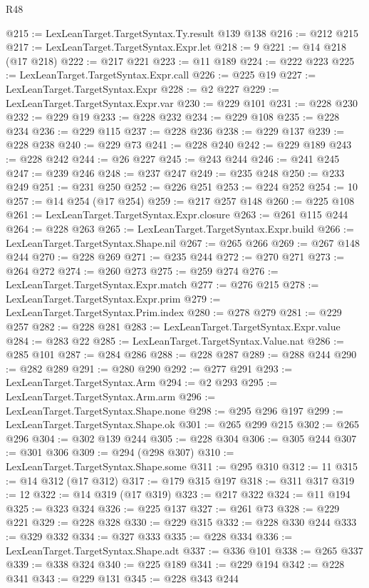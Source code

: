 \begin{lexlean}{R48}
\begin{coremodule}
@215 := LexLeanTarget.TargetSyntax.Ty.result @139 @138
@216 := @212 @215
@217 := LexLeanTarget.TargetSyntax.Expr.let
@218 := 9
@221 := @14 @218 (@17 @218)
@222 := @217 @221
@223 := @11 @189
@224 := @222 @223
@225 := LexLeanTarget.TargetSyntax.Expr.call
@226 := @225 @19
@227 := LexLeanTarget.TargetSyntax.Expr
@228 := @2 @227
@229 := LexLeanTarget.TargetSyntax.Expr.var
@230 := @229 @101
@231 := @228 @230
@232 := @229 @19
@233 := @228 @232
@234 := @229 @108
@235 := @228 @234
@236 := @229 @115
@237 := @228 @236
@238 := @229 @137
@239 := @228 @238
@240 := @229 @73
@241 := @228 @240
@242 := @229 @189
@243 := @228 @242
@244 := @26 @227
@245 := @243 @244
@246 := @241 @245
@247 := @239 @246
@248 := @237 @247
@249 := @235 @248
@250 := @233 @249
@251 := @231 @250
@252 := @226 @251
@253 := @224 @252
@254 := 10
@257 := @14 @254 (@17 @254)
@259 := @217 @257 @148
@260 := @225 @108
@261 := LexLeanTarget.TargetSyntax.Expr.closure
@263 := @261 @115 @244
@264 := @228 @263
@265 := LexLeanTarget.TargetSyntax.Expr.build
@266 := LexLeanTarget.TargetSyntax.Shape.nil
@267 := @265 @266
@269 := @267 @148 @244
@270 := @228 @269
@271 := @235 @244
@272 := @270 @271
@273 := @264 @272
@274 := @260 @273
@275 := @259 @274
@276 := LexLeanTarget.TargetSyntax.Expr.match
@277 := @276 @215
@278 := LexLeanTarget.TargetSyntax.Expr.prim
@279 := LexLeanTarget.TargetSyntax.Prim.index
@280 := @278 @279
@281 := @229 @257
@282 := @228 @281
@283 := LexLeanTarget.TargetSyntax.Expr.value
@284 := @283 @22
@285 := LexLeanTarget.TargetSyntax.Value.nat
@286 := @285 @101
@287 := @284 @286
@288 := @228 @287
@289 := @288 @244
@290 := @282 @289
@291 := @280 @290
@292 := @277 @291
@293 := LexLeanTarget.TargetSyntax.Arm
@294 := @2 @293
@295 := LexLeanTarget.TargetSyntax.Arm.arm
@296 := LexLeanTarget.TargetSyntax.Shape.none
@298 := @295 @296 @197
@299 := LexLeanTarget.TargetSyntax.Shape.ok
@301 := @265 @299 @215
@302 := @265 @296
@304 := @302 @139 @244
@305 := @228 @304
@306 := @305 @244
@307 := @301 @306
@309 := @294 (@298 @307)
@310 := LexLeanTarget.TargetSyntax.Shape.some
@311 := @295 @310
@312 := 11
@315 := @14 @312 (@17 @312)
@317 := @179 @315 @197
@318 := @311 @317
@319 := 12
@322 := @14 @319 (@17 @319)
@323 := @217 @322
@324 := @11 @194
@325 := @323 @324
@326 := @225 @137
@327 := @261 @73
@328 := @229 @221
@329 := @228 @328
@330 := @229 @315
@332 := @228 @330 @244
@333 := @329 @332
@334 := @327 @333
@335 := @228 @334
@336 := LexLeanTarget.TargetSyntax.Shape.adt
@337 := @336 @101
@338 := @265 @337
@339 := @338 @324
@340 := @225 @189
@341 := @229 @194
@342 := @228 @341
@343 := @229 @131
@345 := @228 @343 @244

\end{coremodule}
\end{lexlean}
